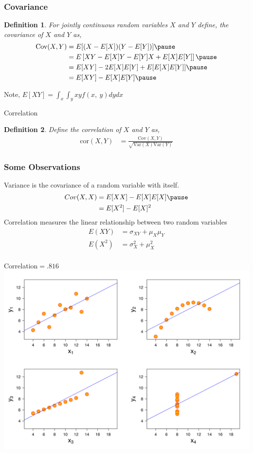 \documentclass[aspectratio=169, handout]{beamer}
\newtheorem{defn}{Definition}
\numberwithin{equation}{section}
\begin{document}
\begin{frame}
\frametitle{Covariance} 

\begin{defn} 
For jointly continuous random variables $X$ and $Y$ define, the covariance of $X$ and $Y$ as,\pause 
\begin{align*}
\text{Cov}(X,Y) & =  E[(X-E[X])(Y- E[Y])]  \pause  \\
& =  E\left[ XY - E[X] Y - E[Y] X + E[X]E[Y] \right]  \pause  \\
& =  E[XY] - 2E[X]E[Y] + E[E[X]E[Y]]   \pause \\
& =  E[XY] - E[X]E[Y] \pause 
\end{align*}
\end{defn} 
Note, $E[XY]=\int_x\int_y xy f(x,\ y)dy dx$
\end{frame}


\begin{frame}{Correlation}
\begin{defn} 
Define the correlation of $X$ and $Y$ as,  \pause 
\begin{align*}
\text{cor}(X,Y) & =  \frac{\text{Cov}(X,Y) }{\sqrt{\text{Var}(X) \text{Var}(Y) } }
\end{align*}
\end{defn} 
\end{frame}


\begin{frame}
\frametitle{Some Observations}

Variance is the covariance of a random variable with itself.\pause 
\begin{align*}
Cov(X,X) & =  E[X X] - E[X]E[X] \pause \\
& =  E[X^2] - E[X]^2
\end{align*}
\pause 
Correlation measures the linear relationship between two random variables\\ 

\begin{align*}
E(XY) & =  \sigma_{XY}+\mu_X\mu_Y  \\
E(X^2) & =  \sigma^2_{X}+\mu^2_X  \\
\end{align*}

\end{frame}


\begin{frame}{Correlation$=.816$}
\includegraphics[width=3.5 in]{Anscomb.png}
\end{frame}
\end{document}

